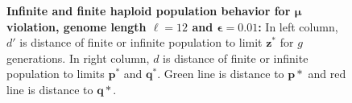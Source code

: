 \begin{figure}[h]
\begin{center}
\hspace{-3em}%
\vspace{-0.5em} \hspace{-3em}%
\caption[\textbf{Infinite and finite haploid population behavior for $\bm{\mu}$ violation, genome length $\ell = 12$ and $\bm{\epsilon} = 0.01$}]{\textbf{Infinite and finite haploid population behavior for $\bm{\mu}$ violation, genome length $\ell = 12$ and $\bm{\epsilon} = 0.01$:} 
  In left column, $d'$ is distance of finite or infinite population to limit $\bm{z}^\ast$ for $g$ generations. In right column, $d$ is distance of finite or infinite population to limits $\bm{p}^\ast$ and $\bm{q}^\ast$. Green line is distance to $\bm{p*}$ and red line is distance to $\bm{q*}$.}
\label{oscillation_12h_vio_mu_0.01}
\end{center}
\end{figure}

